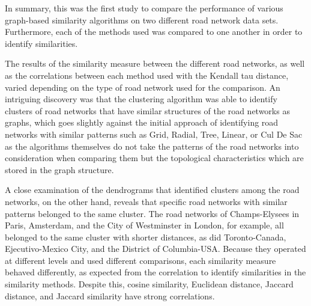 
In summary, this was the first study to compare the performance of various graph-based similarity algorithms on two different road network data sets. Furthermore, each of the methods used was compared to one another in order to identify similarities.

The results of the similarity measure between the different road networks, as well as the correlations between each method used with the Kendall tau distance, varied depending on the type of road network used for the comparison. An intriguing discovery was that the clustering algorithm was able to identify clusters of road networks that have similar structures of the road networks as graphs, which goes slightly against the initial approach of identifying road networks with similar patterns such as Grid, Radial, Tree, Linear, or Cul De Sac as the algorithms themselves do not take the patterns of the road networks into consideration when comparing them but the topological characteristics which are stored in the graph structure.

A close examination of the dendrograms that identified clusters among the road networks, on the other hand, reveals that specific road networks with similar patterns belonged to the same cluster. The road networks of Champs-Elysees in Paris, Amsterdam, and the City of Westminster in London, for example, all belonged to the same cluster with shorter distances, as did Toronto-Canada, Ejecutivo-Mexico City, and the District of Columbia-USA. Because they operated at different levels and used different comparisons, each similarity measure behaved differently, as expected from the correlation to identify similarities in the similarity methods. Despite this, cosine similarity, Euclidean distance, Jaccard distance, and Jaccard similarity have strong correlations.


